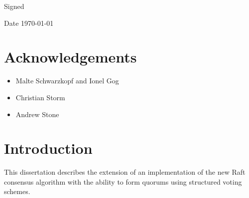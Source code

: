 \documentclass[11pt,chapterprefix=true,toc=bibliography,numbers=noendperiod,
               footnotes=multiple,twoside]{scrreprt}
\begin{document}
\vspace{0.3in}
Signed

\vspace{0.2in}
Date \hspace{0.4in} \today



\chapter*{Acknowledgements\label{ch:acknowledgements}}

\begin{itemize}
    \item Malte Schwarzkopf and Ionel Gog
    \item Christian Storm
    \item Andrew Stone
\end{itemize}

\tableofcontents





\chapter{Introduction\label{ch:introduction}}


This dissertation describes the extension of an implementation of the new Raft consensus algorithm with the ability to form quorums using structured voting schemes.


\end{document}
